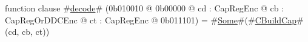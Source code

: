 function clause #\hyperref[zdecode]{decode}# (0b010010 @ 0b00000 @ cd : CapRegEnc @ cb : CapRegOrDDCEnc @ ct : CapRegEnc @ 0b011101) = #\hyperref[zSome]{Some}#(#\hyperref[zCBuildCap]{CBuildCap}#(cd, cb, ct))
